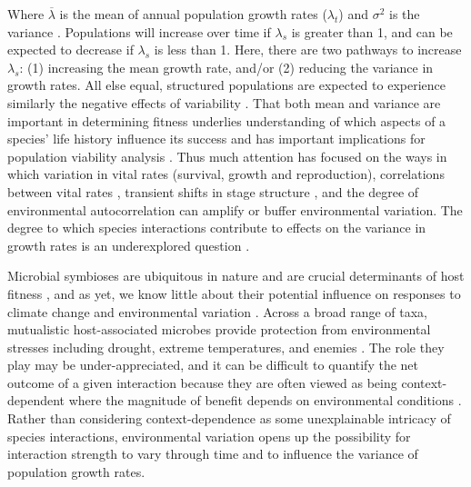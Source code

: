 \documentclass[9pt,twocolumn,twoside,lineno]{pnas-new}
\begin{document}
Where $\overline{\lambda}$ is the mean of annual population growth rates ($\lambda_t$) and $\sigma^2$ is the variance \citep{lewontin_population_1969}. Populations will increase over time if $\lambda_s$ is greater than 1, and can be expected to decrease if $\lambda_s$ is less than 1. Here, there are two pathways to increase $\lambda_s$:  (1) increasing the mean growth rate, and/or (2) reducing the variance in growth rates.  All else equal, structured populations are expected to experience similarly the negative effects of variability \cite{cohen1979comparative, tuljapurkar2013population}. That both mean and variance are important in determining fitness underlies understanding of which aspects of a species' life history influence its success \cite{pfister1998patterns, morris2008longevity} and has important implications for population viability analysis \cite{menges1990population}. Thus much attention has focused on the ways in which variation in vital rates (survival, growth and reproduction)\cite{}, correlations between vital rates \cite{compagnoni2016effect}, transient shifts in stage structure \cite{ellis2013role}, and the degree of environmental autocorrelation \cite{tuljapurkar1980population, fieberg2001stochastic} can amplify or buffer environmental variation. The degree to which species interactions contribute to effects on the variance in growth rates is an underexplored question \cite{hilde_demographic_2020}.

Microbial symbioses are ubiquitous in nature and are crucial determinants of host fitness \cite{rodriguez2009fungal, mcfall2013animals}, and as yet, we know little about their potential influence on responses to climate change and environmental variation \cite{rudgers2020climate}. Across a broad range of taxa, mutualistic host-associated microbes provide protection from environmental stresses including drought, extreme temperatures, and enemies \cite{russell2006costs, brownlie2009symbiont, kivlin2013fungal,corbin2017heritable, hoadley2019host}. The role they play may be under-appreciated, and it can be difficult to quantify the net outcome of a given interaction because they are often viewed as being context-dependent where the magnitude of benefit depends on environmental conditions \cite{chamberlain2014context}. Rather than considering context-dependence as some unexplainable intricacy of species interactions, environmental variation opens up the possibility for interaction strength to vary through time \cite{jordano1994spatial, billick2003relative} and to influence the variance of population growth rates. 
\end{document}
